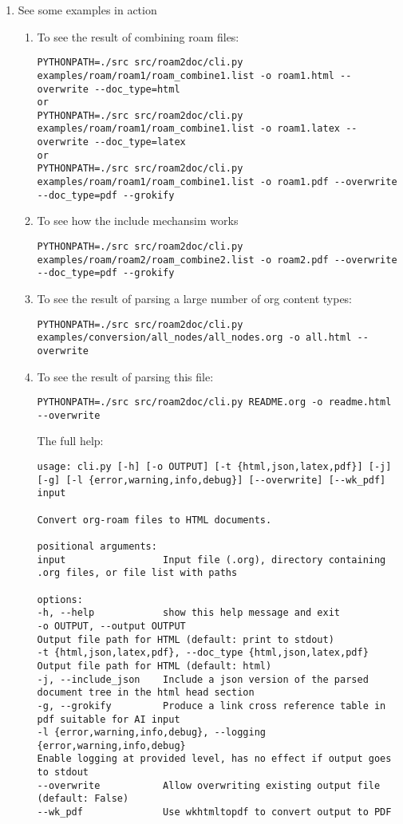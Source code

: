 \documentclass[11pt]{article}
\begin{document}
\begin{enumerate}
\item
See some examples in action
\begin{enumerate}
\item
To see the result of combining roam files:
\begin{verbatim}
PYTHONPATH=./src src/roam2doc/cli.py examples/roam/roam1/roam_combine1.list -o roam1.html --overwrite --doc_type=html
or
PYTHONPATH=./src src/roam2doc/cli.py examples/roam/roam1/roam_combine1.list -o roam1.latex --overwrite --doc_type=latex
or 
PYTHONPATH=./src src/roam2doc/cli.py examples/roam/roam1/roam_combine1.list -o roam1.pdf --overwrite --doc_type=pdf --grokify

\end{verbatim}
\item
To see how the include mechansim works
\begin{verbatim}
PYTHONPATH=./src src/roam2doc/cli.py  examples/roam/roam2/roam_combine2.list -o roam2.pdf --overwrite --doc_type=pdf --grokify
\end{verbatim}
\item
To see the result of parsing a large number of org content types:
\begin{verbatim}
PYTHONPATH=./src src/roam2doc/cli.py examples/conversion/all_nodes/all_nodes.org -o all.html --overwrite 
\end{verbatim}
\item
To see the result of parsing this file:
\begin{verbatim}
PYTHONPATH=./src src/roam2doc/cli.py README.org -o readme.html --overwrite    
\end{verbatim}
The full help:

\begin{verbatim}
usage: cli.py [-h] [-o OUTPUT] [-t {html,json,latex,pdf}] [-j] [-g] [-l {error,warning,info,debug}] [--overwrite] [--wk_pdf] input

Convert org-roam files to HTML documents.

positional arguments:
input                 Input file (.org), directory containing .org files, or file list with paths

options:
-h, --help            show this help message and exit
-o OUTPUT, --output OUTPUT
Output file path for HTML (default: print to stdout)
-t {html,json,latex,pdf}, --doc_type {html,json,latex,pdf}
Output file path for HTML (default: html)
-j, --include_json    Include a json version of the parsed document tree in the html head section
-g, --grokify         Produce a link cross reference table in pdf suitable for AI input
-l {error,warning,info,debug}, --logging {error,warning,info,debug}
Enable logging at provided level, has no effect if output goes to stdout
--overwrite           Allow overwriting existing output file (default: False)
--wk_pdf              Use wkhtmltopdf to convert output to PDF

\end{verbatim}
\vspace{\baselineskip}
\end{enumerate}
\end{enumerate}
\end{document}

